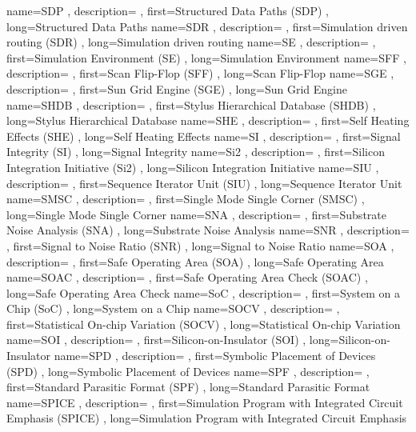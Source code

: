 { name={SDP}
, description={}
, first={Structured Data Paths (SDP)}
, long={Structured Data Paths}
}
{ name={SDR}
, description={}
, first={Simulation driven routing (SDR)}
, long={Simulation driven routing}
}
{ name={SE}
, description={}
, first={Simulation Environment (SE)}
, long={Simulation Environment}
}
{ name={SFF}
, description={}
, first={Scan Flip-Flop (SFF)}
, long={Scan Flip-Flop}
}
{ name={SGE}
, description={}
, first={Sun Grid Engine (SGE)}
, long={Sun Grid Engine}
}
{ name={SHDB}
, description={}
, first={Stylus Hierarchical Database (SHDB)}
, long={Stylus Hierarchical Database}
}
{ name={SHE}
, description={}
, first={Self Heating Effects (SHE)}
, long={Self Heating Effects}
}
{ name={SI}
, description={}
, first={Signal Integrity (SI)}
, long={Signal Integrity}
}
{ name={Si2}
, description={}
, first={Silicon Integration Initiative (Si2)}
, long={Silicon Integration Initiative}
}
{ name={SIU}
, description={}
, first={Sequence Iterator Unit (SIU)}
, long={Sequence Iterator Unit}
}
{ name={SMSC}
, description={}
, first={Single Mode Single Corner (SMSC)}
, long={Single Mode Single Corner}
}
{ name={SNA}
, description={}
, first={Substrate Noise Analysis (SNA)}
, long={Substrate Noise Analysis}
}
{ name={SNR}
, description={}
, first={Signal to Noise Ratio (SNR)}
, long={Signal to Noise Ratio}
}
{ name={SOA}
, description={}
, first={Safe Operating Area (SOA)}
, long={Safe Operating Area}
}
{ name={SOAC}
, description={}
, first={Safe Operating Area Check (SOAC)}
, long={Safe Operating Area Check}
}
{ name={SoC}
, description={}
, first={System on a Chip (SoC)}
, long={System on a Chip}
}
{ name={SOCV}
, description={}
, first={Statistical On-chip Variation (SOCV)}
, long={Statistical On-chip Variation}
}
{ name={SOI}
, description={}
, first={Silicon-on-Insulator (SOI)}
, long={Silicon-on-Insulator}
}
{ name={SPD}
, description={}
, first={Symbolic Placement of Devices (SPD)}
, long={Symbolic Placement of Devices}
}
{ name={SPF}
, description={}
, first={Standard Parasitic Format (SPF)}
, long={Standard Parasitic Format}
}
{ name={SPICE}
, description={}
, first={Simulation Program with Integrated Circuit Emphasis (SPICE)}
, long={Simulation Program with Integrated Circuit Emphasis}
}
